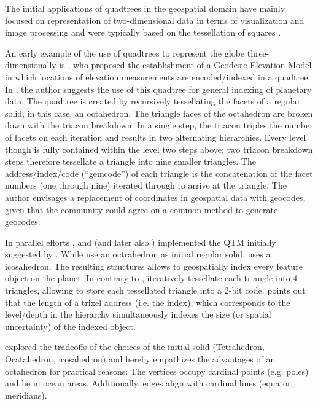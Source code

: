 \documentclass[a4paper,10pt]{article}
\begin{document}
The initial applications of quadtrees in the geospatial domain have mainly focused on representation of two-dimensional data in terms of visualization and image processing and were typically based on the tessellation of squares \citep{Lugo1995}.

An early example of the use of quadtrees to represent the globe three-dimensionally is \citep{Dutton1984}, who proposed the establishment of a Geodesic Elevation Model in which locations of elevation measurements are encoded/indexed in a quadtree. 
In \citep{Dutton1989}, the author suggests the use of this quadtree for general indexing of planetary data.
The quadtree is created by recursively tessellating the facets of a regular solid, in this case, an octahedron.
The triangle faces of the octahedron are broken down with the triacon breakdown. In a single step, the triacon triples the number of facets on each iteration and results in two alternating hierarchies. Every level though is fully contained within the level two steps above; two triacon breakdown steps therefore tessellate a triangle into nine smaller triangles. The address/index/code (``gemcode'') of each triangle is the concatenation of the facet numbers (one through nine) iterated through to arrive at the triangle. The author envisages a replacement of coordinates in geospatial data with geocodes, given that the community could agree on a common method to generate geocodes.

In parallel efforts \citep{Fekete1990, Fekete1990a}, and \citep{Goodchild1992a} (and later also \cite{Lugo1995}) implemented the \gls{QTM} initially suggested by \citep{Dutton1984}. While \citep{Goodchild1992a} use an octrahedron as initial regular solid, \citep{Fekete1990, Fekete1990a} uses a icosahedron.
The resulting structures allows to geospatially index every feature object on the planet. 
In contrary to \citep{Dutton1984}, \citep{Fekete1990, Fekete1990a, Goodchild1992a, Lugo1995} iteratively tessellate each triangle into 4 triangles, allowing to store each tessellated triangle into a 2-bit code.
\citep{Goodchild1992a} points out that the length of a trixel address (i.e. the index), which corresponds to the level/depth in the hierarchy simultaneously indexes the size (or spatial uncertainty) of the indexed object.

\cite{Dutton1996} explored the tradeoffs of the choices of the initial solid (Tetrahedron, Ocatahedron, icosahedron) and hereby empathizes the advantages of an octahedron for practical reasons: The vertices occupy cardinal points (e.g. poles) and lie in ocean areas. Additionally, edges align with cardinal lines (equator, meridians).
\end{document}
